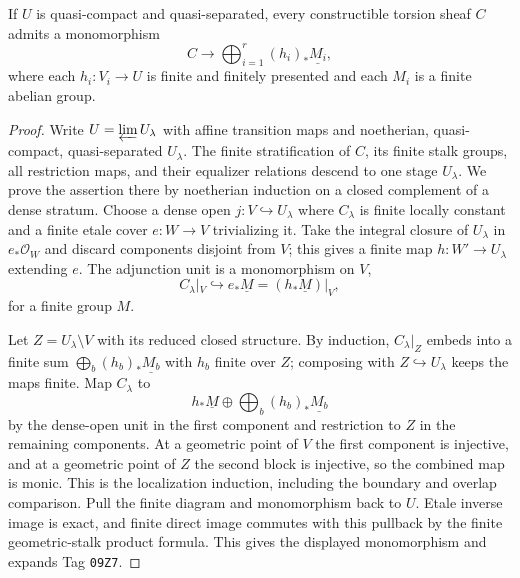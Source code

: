 \begin{lemma}
\label{lemma:weil-pbc-constructible-finite-pushforward}
\uses{}

If $U$ is quasi-compact and quasi-separated, every constructible torsion
sheaf $C$ admits a monomorphism
\[
 C\longrightarrow\bigoplus_{i=1}^r(h_i)_*\underline{M_i},
\]
where each $h_i:V_i\to U$ is finite and finitely presented and each $M_i$ is
a finite abelian group.
\end{lemma}
\begin{proof}

Write $U=\varprojlim U_\lambda$ with affine transition maps and noetherian,
quasi-compact, quasi-separated $U_\lambda$.  The finite stratification of
$C$, its finite stalk groups, all restriction maps, and their equalizer
relations descend to one stage $U_\lambda$.  We prove the assertion there by
noetherian induction on a closed complement of a dense stratum.  Choose a
dense open $j:V\hookrightarrow U_\lambda$ where $C_\lambda$ is finite
locally constant and a finite etale cover $e:W\to V$ trivializing it.  Take
the integral closure of $U_\lambda$ in $e_*\mathcal O_W$ and discard
components disjoint from $V$; this gives a finite map $h:W'\to U_\lambda$
extending $e$.  The adjunction unit is a monomorphism on $V$,
\[
 C_\lambda|_V\hookrightarrow e_*\underline M
      =(h_*\underline M)|_V,
\]
for a finite group $M$.

Let $Z=U_\lambda\setminus V$ with its reduced closed structure.  By
induction, $C_\lambda|_Z$ embeds into a finite sum
$\bigoplus_b(h_b)_*\underline{M_b}$ with $h_b$ finite over $Z$; composing
with $Z\hookrightarrow U_\lambda$ keeps the maps finite.  Map
$C_\lambda$ to
\[
 h_*\underline M\oplus\bigoplus_b(h_b)_*\underline{M_b}
\]
by the dense-open unit in the first component and restriction to $Z$ in the
remaining components.  At a geometric point of $V$ the first component is
injective, and at a geometric point of $Z$ the second block is injective, so
the combined map is monic.  This is the localization induction, including
the boundary and overlap comparison.  Pull the finite diagram and monomorphism
back to $U$.  Etale inverse image is exact, and finite direct image commutes
with this pullback by the finite geometric-stalk product formula.  This gives
the displayed monomorphism and expands Tag \texttt{09Z7}.
\end{proof}


